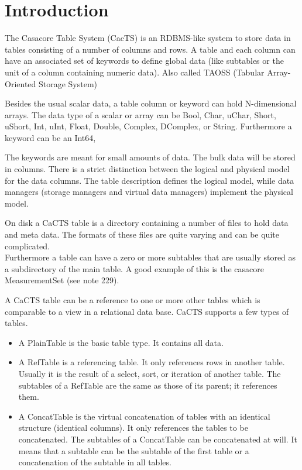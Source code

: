 

\section{Introduction}
The Casacore Table System (CacTS) is an RDBMS-like system to store data in
tables consisting of a number of columns and rows. A
table and each column can have an associated set of keywords
 to define global data (like
subtables or the unit of a column containing numeric data).
Also called TAOSS (Tabular Array-Oriented Storage System)

Besides the usual scalar data, a table column or keyword can hold
N-dimensional arrays.
The data type of a scalar or array can be Bool, Char, uChar, Short,
uShort, Int, uInt, Float, Double, Complex, DComplex, or
String. Furthermore a keyword can be an Int64,

The keywords are meant for small amounts of data. The bulk data will
be stored in columns.
There is a strict distinction between the logical and physical
model for the data columns.
The table description defines the logical model, while data managers
(storage managers and virtual data managers) implement the physical
model.

On disk a CaCTS table is a directory containing
a number of files to hold data and meta data. The formats of these
files are quite varying and can be quite complicated.
\\Furthermore a table can have a zero or more subtables that are
usually stored as a subdirectory of the main table. A good example of
this is the casacore MeasurementSet (see note 229).

A CaCTS table can be a reference to one or more other tables which is
comparable to a view in a relational data base.
CaCTS supports a few types of tables.
\begin{itemize}
\item
A PlainTable is the basic table type. It contains all data.
\item
A RefTable is a referencing table. It only references rows
in another table. Usually it is the result of a select, sort, or
iteration of another table.
The subtables of a RefTable are the same as those of its parent; it
references them.
\item
A ConcatTable is the virtual concatenation of tables with an identical
structure (identical columns). It only references the tables to be
concatenated.
The subtables of a ConcatTable can be concatenated at will. It means
that a subtable can be the subtable of the first table or a
concatenation of the subtable in all tables. 
\end{itemize}

